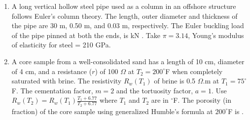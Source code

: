 \documentclass[journal,12pt,onecolumn]{IEEEtran}
\theoremstyle{remark}
\begin{document}
\begin{enumerate}
\item  A long vertical hollow steel pipe used as a column in an offshore structure follows Euler's column theory. The length, outer diameter and thickness of the pipe are 30 m, 0.50 m, and 0.03 m, respectively. The Euler buckling load  of the pipe pinned at both the ends, is \underline{\hspace{1cm}} kN . Take $\pi = 3.14$, Young's modulus of elasticity for steel = 210 GPa.
\begin{enumerate}
\end{enumerate}
\hfill{}



\item  A core sample from a well-consolidated sand has a length of 10 cm, diameter of 4 cm, and a resistance ($r$) of 100 $\Omega$ at $T_2 = 200^\circ$F when completely saturated with brine. The resistivity $R_w(T_1)$ of brine is 0.5 $\Omega$.m at $T_1 = 75^\circ$F. The cementation factor, $m = 2$ and the tortuosity factor, $a = 1$. Use $R_w(T_2) = R_w(T_1) \frac{T_1 + 6.77}{T_2 + 6.77}$ where $T_1$ and $T_2$ are in $^\circ$F. The porosity (in fraction) of the core sample using generalized Humble's formula at $200^\circ$F is \underline{\hspace{1cm}} .
\begin{enumerate}
\end{enumerate}
\hfill{}




\end{enumerate}
\end{document}
